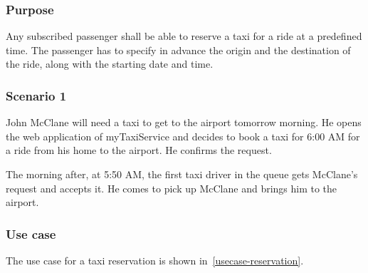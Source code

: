 \label{taxi-reservation}
\subsubsection{Purpose}

Any subscribed passenger shall be able to reserve a taxi for a ride at a predefined time. The passenger has to specify in advance the origin and the destination of the ride, along with the starting date and time.

\subsubsection{Scenario 1}
John McClane will need a taxi to get to the airport tomorrow morning. He opens the web application of myTaxiService and decides to book a taxi for 6:00 AM for a ride from his home to the airport. He confirms the request.

The morning after, at 5:50 AM, the first taxi driver in the queue gets McClane's request and accepts it. He comes to pick up McClane and brings him to the airport.

\subsubsection{Use case}
The use case for a taxi reservation is shown in~\autoref{usecase-reservation}.

